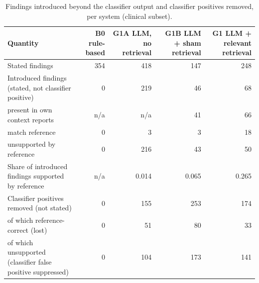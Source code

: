 \begin{table}[t]
\centering
\scriptsize
\begin{tabular}{lrrrr}
\hline
Quantity & B0 rule-based & G1A LLM, no retrieval & G1B LLM + sham retrieval & G1 LLM + relevant retrieval \\
\hline
Stated findings & 354 & 418 & 147 & 248 \\
Introduced findings (stated, not classifier positive) & 0 & 219 & 46 & 68 \\
  present in own context reports & n/a & n/a & 41 & 66 \\
  match reference & 0 & 3 & 3 & 18 \\
  unsupported by reference & 0 & 216 & 43 & 50 \\
Share of introduced findings supported by reference & n/a & 0.014 & 0.065 & 0.265 \\
Classifier positives removed (not stated) & 0 & 155 & 253 & 174 \\
  of which reference-correct (lost) & 0 & 51 & 80 & 33 \\
  of which unsupported (classifier false positive suppressed) & 0 & 104 & 173 & 141 \\
\hline
\end{tabular}
\caption{Findings introduced beyond the classifier output and classifier positives removed, per system (clinical subset).}
\label{tab:table3_introduced_and_removed_findings}
\end{table}
